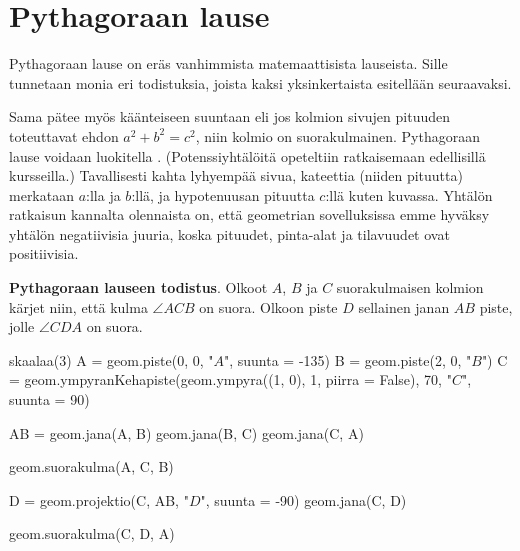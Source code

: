 \section{Pythagoraan lause}

Pythagoraan lause on eräs vanhimmista matemaattisista lauseista. Sille tunnetaan monia eri todistuksia, joista kaksi yksinkertaista esitellään seuraavaksi.

%

Sama pätee myös käänteiseen suuntaan eli jos kolmion sivujen pituuden toteuttavat ehdon $a^2 + b^2 = c^2$, niin kolmio on suorakulmainen. Pythagoraan lause voidaan luokitella . (Potenssiyhtälöitä opeteltiin ratkaisemaan edellisillä kursseilla.) Tavallisesti kahta lyhyempää sivua, kateettia (niiden pituutta) merkataan $a$:lla ja $b$:llä, ja hypotenuusan pituutta $c$:llä kuten kuvassa. Yhtälön ratkaisun kannalta olennaista on, että geometrian sovelluksissa emme hyväksy yhtälön negatiivisia juuria, koska pituudet, pinta-alat ja tilavuudet ovat positiivisia.

\textbf{Pythagoraan lauseen todistus}. Olkoot $A$, $B$ ja $C$ suorakulmaisen kolmion kärjet niin, että kulma $\angle ACB$ on suora. Olkoon piste $D$ sellainen janan $AB$ piste, jolle $\angle CDA$ on suora.

	\begin{center}
\begin{kuva}
skaalaa(3)
A = geom.piste(0, 0, "$A$", suunta = -135)
B = geom.piste(2, 0, "$B$")
C = geom.ympyranKehapiste(geom.ympyra((1, 0), 1, piirra = False), 70, "$C$", suunta = 90)

AB = geom.jana(A, B)
geom.jana(B, C)
geom.jana(C, A)

geom.suorakulma(A, C, B)

D = geom.projektio(C, AB, "$D$", suunta = -90)
geom.jana(C, D)

geom.suorakulma(C, D, A)
\end{kuva}
\end{center}

